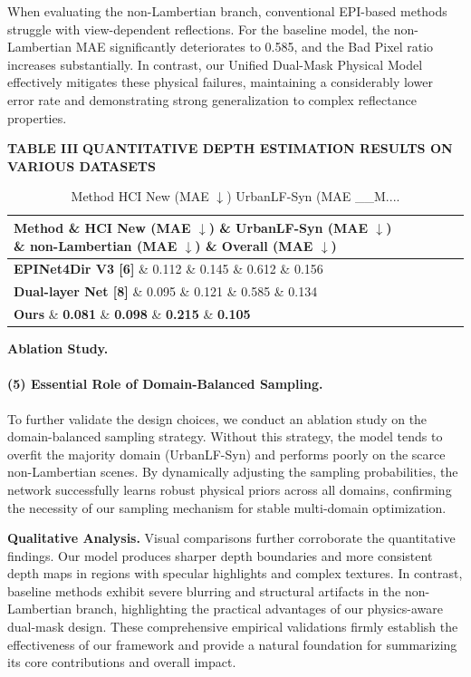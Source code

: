 When evaluating the non-Lambertian branch, conventional EPI-based methods struggle with view-dependent reflections. For the baseline model, the non-Lambertian MAE significantly deteriorates to 0.585, and the Bad Pixel ratio increases substantially. In contrast, our Unified Dual-Mask Physical Model effectively mitigates these physical failures, maintaining a considerably lower error rate and demonstrating strong generalization to complex reflectance properties.

\textbf{TABLE III}
\textbf{QUANTITATIVE DEPTH ESTIMATION RESULTS ON VARIOUS DATASETS}

\begin{table}[!t]
\caption{Method HCI New (MAE $\downarrow$) UrbanLF-Syn (MAE __M....}
\label{tab:table3}
\centering
\begin{tabular*}{\linewidth}{@{\extracolsep{\fill}}lllll}
\toprule
Method \& HCI New (MAE $\downarrow$) \& UrbanLF-Syn (MAE $\downarrow$) \& non-Lambertian (MAE $\downarrow$) \& Overall (MAE $\downarrow$) \\
\midrule
\textbf{EPINet4Dir V3 [6]} \& 0.112 \& 0.145 \& 0.612 \& 0.156 \\
\textbf{Dual-layer Net [8]} \& 0.095 \& 0.121 \& 0.585 \& 0.134 \\
\textbf{Ours} \& \textbf{0.081} \& \textbf{0.098} \& \textbf{0.215} \& \textbf{0.105} \\
\bottomrule
\end{tabular*}
\end{table}
\textbf{Ablation Study.}
\paragraph{(5) Essential Role of Domain-Balanced Sampling.}
To further validate the design choices, we conduct an ablation study on the domain-balanced sampling strategy. Without this strategy, the model tends to overfit the majority domain (UrbanLF-Syn) and performs poorly on the scarce non-Lambertian scenes. By dynamically adjusting the sampling probabilities, the network successfully learns robust physical priors across all domains, confirming the necessity of our sampling mechanism for stable multi-domain optimization.

\textbf{Qualitative Analysis.}
Visual comparisons further corroborate the quantitative findings. Our model produces sharper depth boundaries and more consistent depth maps in regions with specular highlights and complex textures. In contrast, baseline methods exhibit severe blurring and structural artifacts in the non-Lambertian branch, highlighting the practical advantages of our physics-aware dual-mask design. These comprehensive empirical validations firmly establish the effectiveness of our framework and provide a natural foundation for summarizing its core contributions and overall impact.